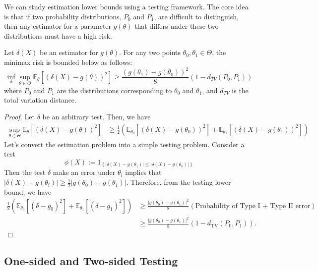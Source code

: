 \begin{remark}
We can study estimation lower bounds using a testing framework. The core idea is that if two probability distributions, $P_0$ and $P_1$, are difficult to distinguish, then any estimator for a parameter $g(\theta)$ that differs under these two distributions must have a high risk.
\end{remark}

\begin{lem}
Let $\delta(X)$ be an estimator for $g(\theta)$. For any two points $\theta_0, \theta_1 \in \Theta$, the minimax risk is bounded below as follows:
$$
\inf_{\delta} \sup_{\theta \in \Theta} \mathbb{E}_{\theta}[(\delta(X) - g(\theta))^2] \ge \frac{(g(\theta_1) - g(\theta_0))^2}{8} \left(1 - d_{TV}(P_0, P_1)\right)
$$
where $P_0$ and $P_1$ are the distributions corresponding to $\theta_0$ and $\theta_1$, and $d_{TV}$ is the total variation distance.
\end{lem}

\begin{proof}
Let $\delta$ be an arbitrary test. Then, we have
\begin{align*}
    \sup_{\theta \in \Theta} \mathbb{E}_{\theta}\left[(\delta(X) - g(\theta))^2\right]&\ge \frac{1}{2} \left( \mathbb{E}_{\theta_0}\left[(\delta(X) - g(\theta_0))^2\right] + \mathbb{E}_{\theta_1}\left[(\delta(X) - g(\theta_1))^2\right] \right)
\end{align*}
Let's convert the estimation problem into a simple testing problem. Consider a test
\[
\phi(X):=1_{\left\{\left|\delta(X)-g\left(\theta_1\right)\right| \leq\left|\delta(X)-g\left(\theta_0\right)\right|\right\}}
\]
Then the test $\delta$ make an error under $\theta_i$ implies that $|\delta(X)-g(\theta_i)|\ge\frac{1}{2} |g(\theta_0)-g(\theta_1)|$. Therefore, from the testing lower bound, we have
\begin{align*}
    \frac{1}{2} \left( \mathbb{E}_{\theta_0}\left[(\delta - g_0)^2\right] + \mathbb{E}_{\theta_1}\left[(\delta - g_1)^2\right] \right)&\ge \frac{|g(\theta_0)-g(\theta_1)|^2}{8}(\text{Probability of Type I + Type II error})\\
    &\ge  \frac{|g(\theta_0)-g(\theta_1)|^2}{8}\left(1 - d_{\text{TV}}(P_0, P_1)\right).
\end{align*}
\end{proof}




\subsection{One-sided and Two-sided Testing}

